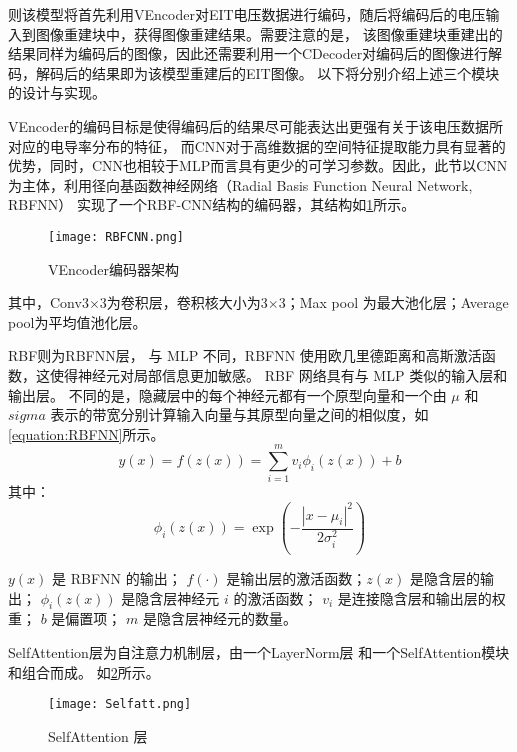 则该模型将首先利用VEncoder对EIT电压数据进行编码，随后将编码后的电压输入到图像重建块中，获得图像重建结果。需要注意的是，
该图像重建块重建出的结果同样为编码后的图像，因此还需要利用一个CDecoder对编码后的图像进行解码，解码后的结果即为该模型重建后的EIT图像。
以下将分别介绍上述三个模块的设计与实现。





VEncoder的编码目标是使得编码后的结果尽可能表达出更强有关于该电压数据所对应的电导率分布的特征，
而CNN对于高维数据的空间特征提取能力具有显著的优势，同时，CNN也相较于MLP而言具有更少的可学习参数。因此，此节以CNN为主体，利用径向基函数神经网络（Radial Basis Function Neural Network, RBFNN）
实现了一个RBF-CNN结构的编码器，其结构如\cref{figure:RBFCNN}所示。
\begin{figure}[h]
    \centering
    \texttt{[image: RBFCNN.png]}
    \caption{VEncoder编码器架构}
    \label{figure:RBFCNN}
\end{figure}

其中，Conv3$\times$3为卷积层，卷积核大小为3$\times$3；Max pool 为最大池化层；Average pool为平均值池化层。

RBF则为RBFNN层，
与 MLP 不同，RBFNN 使用欧几里德距离和高斯激活函数，这使得神经元对局部信息更加敏感。 
RBF 网络具有与 MLP 类似的输入层和输出层。
不同的是，隐藏层中的每个神经元都有一个原型向量和一个由 $\mu$ 和 $sigma$ 表示的带宽分别计算输入向量与其原型向量之间的相似度，如\cref{equation:RBFNN}所示。
\begin{equation}
    \label{equation:RBFNN}
    y(x) = f(z(x)) = \sum_{i=1}^{m} v_i \phi_i(z(x)) + b
\end{equation}
其中：
\begin{equation}
    \phi_i(z(x)) = \exp\left(-\frac{|x - \mu_i|^2}{2\sigma_i^2}\right)
\end{equation}

$y(x)$ 是 RBFNN 的输出；
$f(\cdot)$ 是输出层的激活函数；$z(x)$ 是隐含层的输出；
$\phi_i(z(x))$ 是隐含层神经元 $i$ 的激活函数；
$v_i$ 是连接隐含层和输出层的权重；
$b$ 是偏置项；
$m$ 是隐含层神经元的数量。

SelfAttention层为自注意力机制层，由一个LayerNorm层 和一个SelfAttention模块和组合而成。
如\cref{figure:Selfatt}所示。
\begin{figure}[h]
    \centering
    \texttt{[image: Selfatt.png]}
    \caption{SelfAttention 层}
    \label{figure:Selfatt}
\end{figure}

